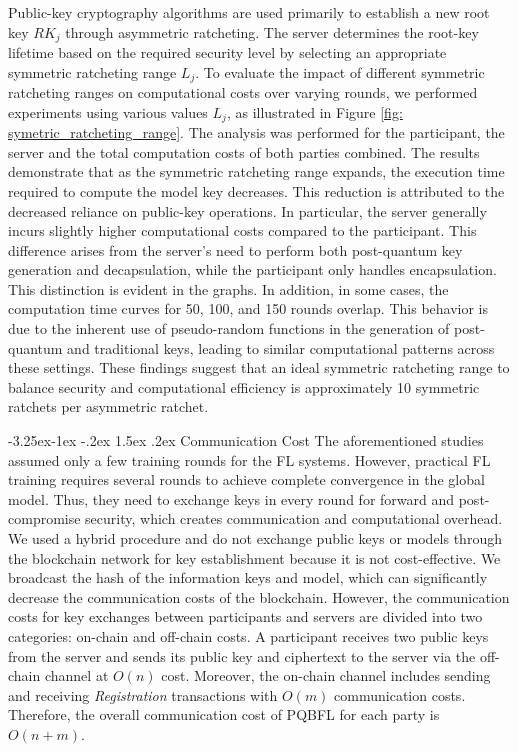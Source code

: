 \documentclass[a4paper,fleqn]{cas-dc}
\makeatletter
\renewcommand\subsection{\@startsection{subsection}{2}{\z@}%
   {-3.25ex\@plus -1ex \@minus -.2ex}%
   {1.5ex \@plus .2ex}%
   {\normalfont\large}} %
\makeatother
\begin{document}
Public-key cryptography algorithms are used primarily to establish a new root key $RK_{j}$ through asymmetric ratcheting. 
The server determines the root-key lifetime based on the required security level by selecting an appropriate symmetric ratcheting range $L_{j}$. 
To evaluate the impact of different symmetric ratcheting ranges on computational costs over varying rounds, we performed experiments using various values $L_{j}$, as illustrated in Figure \ref{fig: symetric_ratcheting_range}. 
The analysis was performed for the participant, the server and the total computation costs of both parties combined.
The results demonstrate that as the symmetric ratcheting range expands, the execution time required to compute the model key decreases. This reduction is attributed to the decreased reliance on public-key operations. 
In particular, the server generally incurs slightly higher computational costs compared to the participant. 
This difference arises from the server's need to perform both post-quantum key generation and decapsulation, while the participant only handles encapsulation. This distinction is evident in the graphs.
In addition, in some cases, the computation time curves for 50, 100, and 150 rounds overlap. 
This behavior is due to the inherent use of pseudo-random functions in the generation of post-quantum and traditional keys, leading to similar computational patterns across these settings. 
These findings suggest that an ideal symmetric ratcheting range to balance security and computational efficiency is approximately 10 symmetric ratchets per asymmetric ratchet.



\subsection{Communication Cost}
The aforementioned studies assumed only a few training rounds for the FL systems. 
However, practical FL training requires several rounds to achieve complete convergence in the global model. 
Thus, they need to exchange keys in every round for forward and post-compromise security, which creates communication and computational overhead.  
We used a hybrid procedure and do not exchange public keys or models through the blockchain network for key establishment because it is not cost-effective. 
We broadcast the hash of the information keys and model, which can significantly decrease the communication costs of the blockchain. 
However, the communication costs for key exchanges between participants and servers are divided into two categories: on-chain and off-chain costs.  
A participant receives two public keys from the server and sends its public key and ciphertext to the server via the off-chain channel at $O(n)$ cost.
Moreover, the on-chain channel includes sending and receiving \textit{Registration} transactions with $O(m)$ communication costs. 
Therefore, the overall communication cost of PQBFL for each party is $O(n+m)$.
\end{document}
